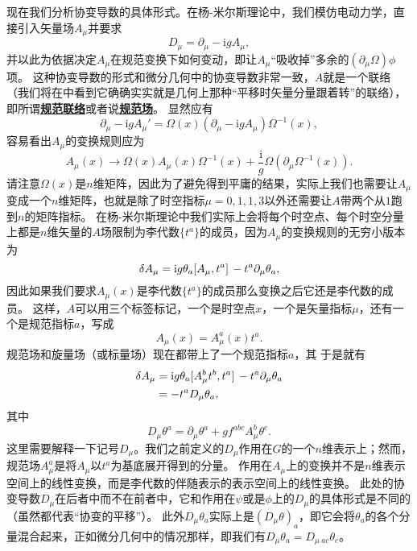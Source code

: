 \documentclass[hyperref, UTF8, a4paper]{ctexart}
\newcommand*{\ii}{\mathrm{i}}
\renewcommand{\autoref}{\prettyref}
\newcommand{\concept}[1]{\underline{\textbf{#1}}}
\begin{document}
现在我们分析协变导数的具体形式。在杨-米尔斯理论中，我们模仿电动力学，直接引入矢量场$A_\mu$并要求
\begin{equation}
    D_\mu = \partial_\mu - \ii g A_\mu,
\end{equation}
并以此为依据决定$A_\mu$在规范变换下如何变动，即让$A_\mu$“吸收掉”多余的$(\partial_\mu \Omega) \phi$项。
这种协变导数的形式和微分几何中的协变导数非常一致，$A$就是一个联络（我们将在\autoref{sec:transition}中看到它确确实实就是几何上那种“平移时矢量分量跟着转”的联络），即所谓\concept{规范联络}或者说\concept{规范场}。
显然应有
\[
    \partial_\mu - \ii g A_\mu' = \Omega(x) (\partial_\mu - \ii g A_\mu) \Omega^{-1}(x),
\]
容易看出$A_\mu$的变换规则应为
\begin{equation}
    A_\mu(x) \to \Omega(x) A_\mu(x) \Omega^{-1}(x) + \frac{\ii}{g} \Omega (\partial_\mu \Omega^{-1}(x)). 
\end{equation}
请注意$\Omega(x)$是$n$维矩阵，因此为了避免得到平庸的结果，实际上我们也需要让$A_\mu$变成一个$n$维矩阵，也就是除了时空指标$\mu=0, 1, 1, 3$以外还需要让$A$带两个从$1$跑到$n$的矩阵指标。
在杨-米尔斯理论中我们实际上会将每个时空点、每个时空分量上都是$n$维矢量的$A$场限制为李代数$\{t^a\}$的成员，因为$A_\mu$的变换规则的无穷小版本为
\[
    \var{A_\mu} = \ii g \theta_a \comm*{A_\mu}{t^a} - t^a \partial_\mu \theta_a,
\]
因此如果我们要求$A_\mu(x)$是李代数$\{t^a\}$的成员那么变换之后它还是李代数的成员。
这样，$A$可以用三个标签标记，一个是时空点$x$，一个是矢量指标$\mu$，还有一个是规范指标$a$，写成
\begin{equation}
    A_\mu(x) = A_\mu^a(x) t^a.
\end{equation}
规范场和旋量场（或标量场）现在都带上了一个规范指标$a$，其
于是就有
\begin{equation}
    \begin{aligned}
        \var{A_\mu} &= \ii g \theta_a \comm*{A_\mu^b t^b}{t^a} - t^a \partial_\mu \theta_a \\
        &= - t^a D_\mu \theta_a,
    \end{aligned}
\end{equation}
其中
\begin{equation}
    D_\mu \theta^a = \partial_\mu \theta^a + g f^{abc} A^b_\mu \theta^c.
\end{equation}
这里需要解释一下记号$D_\mu$。我们之前定义的$D_\mu$作用在$G$的一个$n$维表示上；然而，规范场$A_\mu^a$是将$A_\mu$以$t^a$为基底展开得到的分量。
作用在$A_\mu$上的变换并不是$n$维表示空间上的线性变换，而是李代数的伴随表示的表示空间上的线性变换。
此处的协变导数$D_\mu$在后者中而不在前者中，它和作用在$\psi$或是$\phi$上的$D_\mu$的具体形式是不同的（虽然都代表“协变的平移”）。
此外$D_\mu \theta_a$实际上是$(D_\mu \theta)_a$，即它会将$\theta_a$的各个分量混合起来，正如微分几何中的情况那样，即我们有$D_\mu \theta_a = D_{\mu \ ac} \theta_c$。
\end{document}
